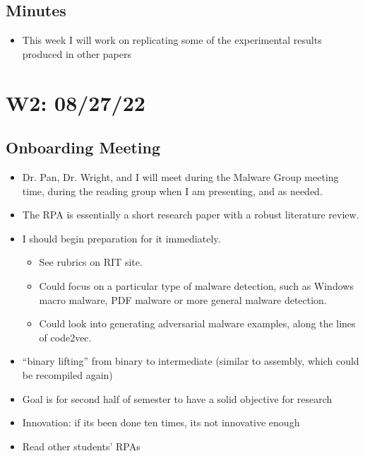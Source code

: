 \documentclass{article}
\begin{document}
\subsection*{Minutes}

\begin{itemize}
\item This week I will work on replicating some of the experimental results produced in other papers
\end{itemize}

\pagebreak



\section*{W2: 08/27/22}

\subsection*{Onboarding Meeting}

\begin{itemize}
	\item Dr. Pan, Dr. Wright, and I will meet during the Malware Group meeting time, during the reading group when I am presenting, and as needed.
	\item The RPA is essentially a short research paper with a robust literature review. 
	\item I should begin preparation for it immediately. 
	\begin{itemize}
		\item See rubrics on RIT site.
		\item Could focus on a particular type of malware detection, such as Windows macro malware, PDF malware or more general malware detection.
		\item Could look into generating adversarial malware examples, along the lines of code2vec.
	\end{itemize}
	\item ``binary lifting'' from binary to intermediate (similar to assembly, which could be recompiled again)
	\item Goal is for second half of semester to have a solid objective for research
	\item Innovation: if its been done ten times, its not innovative enough
	\item Read other students' RPAs
\end{itemize}
\end{document}
